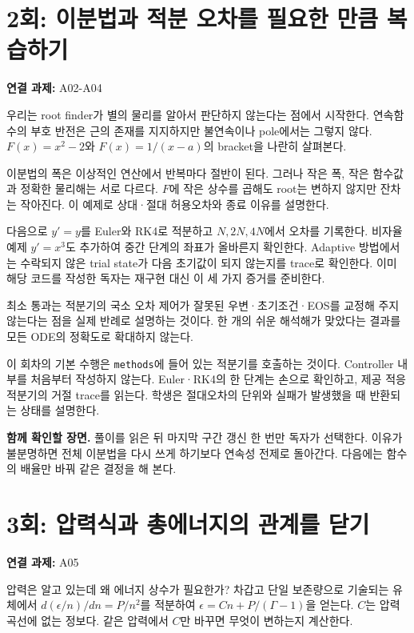 \documentclass[
  10pt,
  a4paper,
]{article}
\begin{document}
\section{2회: 이분법과 적분 오차를 필요한 만큼
복습하기}\label{uxd68c-uxc774uxbd84uxbc95uxacfc-uxc801uxbd84-uxc624uxcc28uxb97c-uxd544uxc694uxd55c-uxb9ccuxd07c-uxbcf5uxc2b5uxd558uxae30}

\textbf{연결 과제:} A02-A04

우리는 root finder가 별의 물리를 알아서 판단하지 않는다는 점에서
시작한다. 연속함수의 부호 반전은 근의 존재를 지지하지만 불연속이나
pole에서는 그렇지 않다. \(F(x)=x^2-2\)와 \(F(x)=1/(x-a)\)의 bracket을
나란히 살펴본다.

이분법의 폭은 이상적인 연산에서 반복마다 절반이 된다. 그러나 작은 폭,
작은 함수값과 정확한 물리해는 서로 다르다. \(F\)에 작은 상수를 곱해도
root는 변하지 않지만 잔차는 작아진다. 이 예제로 상대·절대 허용오차와
종료 이유를 설명한다.

다음으로 \(y'=y\)를 Euler와 RK4로 적분하고 \(N,2N,4N\)에서 오차를
기록한다. 비자율 예제 \(y'=x^3\)도 추가하여 중간 단계의 좌표가 올바른지
확인한다. Adaptive 방법에서는 수락되지 않은 trial state가 다음 초기값이
되지 않는지를 trace로 확인한다. 이미 해당 코드를 작성한 독자는 재구현
대신 이 세 가지 증거를 준비한다.

최소 통과는 적분기의 국소 오차 제어가 잘못된 우변·초기조건·EOS를 교정해
주지 않는다는 점을 실제 반례로 설명하는 것이다. 한 개의 쉬운 해석해가
맞았다는 결과를 모든 ODE의 정확도로 확대하지 않는다.

이 회차의 기본 수행은 \texttt{methods}에 들어 있는 적분기를 호출하는
것이다. Controller 내부를 처음부터 작성하지 않는다. Euler·RK4의 한
단계는 손으로 확인하고, 제공 적응 적분기의 거절 trace를 읽는다. 학생은
절대오차의 단위와 실패가 발생했을 때 반환되는 상태를 설명한다.

\textbf{함께 확인할 장면.} 풀이를 읽은 뒤 마지막 구간 갱신 한 번만
독자가 선택한다. 이유가 불분명하면 전체 이분법을 다시 쓰게 하기보다
연속성 전제로 돌아간다. 다음에는 함수의 배율만 바꿔 같은 결정을 해 본다.

\section{3회: 압력식과 총에너지의 관계를
닫기}\label{uxd68c-uxc555uxb825uxc2dduxacfc-uxcd1duxc5d0uxb108uxc9c0uxc758-uxad00uxacc4uxb97c-uxb2ebuxae30}

\textbf{연결 과제:} A05

압력은 알고 있는데 왜 에너지 상수가 필요한가? 차갑고 단일 보존량으로
기술되는 유체에서 \(d(\epsilon/n)/dn=P/n^2\)를 적분하여
\(\epsilon=Cn+P/(\Gamma-1)\)을 얻는다. \(C\)는 압력곡선에 없는 정보다.
같은 압력에서 \(C\)만 바꾸면 무엇이 변하는지 계산한다.
\end{document}
